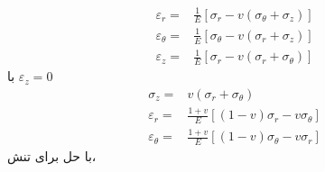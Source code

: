 \documentclass[11pt]{article} %
\begin{document}
\begin{equation}\nonumber
\begin{aligned}
\varepsilon_{r}=&\frac{1}{E}\left[\sigma_{r}-v\left(\sigma_{\theta}+\sigma_{z}\right)\right]\\
\varepsilon_{\theta}=&\frac{1}{E}\left[\sigma_{\theta}-v\left(\sigma_{r}+\sigma_{z}\right)\right]\\
\varepsilon_{z}=&\frac{1}{E}\left[\sigma_{r}-v\left(\sigma_{r}+\sigma_{\theta}\right)\right]
\end{aligned}
\end{equation}
با
 $\varepsilon_z=0$
\begin{equation}\nonumber
\begin{aligned}
\sigma_{z}=&v\left(\sigma_{r}+\sigma_{\theta}\right)\\
\varepsilon_{r}=&\frac{1+v}{E}\left[(1-v) \sigma_{r}-v \sigma_{\theta}\right]\\
\varepsilon_{\theta}=&\frac{1+v}{E}\left[(1-v) \sigma_{\theta}-v \sigma_{r}\right]
\end{aligned}
\end{equation}
با حل برای تنش،
\end{document}
